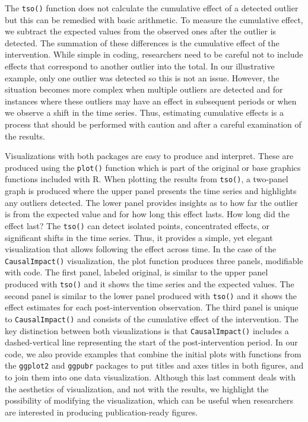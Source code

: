 \documentclass[12pt]{article}
\begin{document}
The \texttt{tso()} function does not calculate the cumulative effect of
a detected outlier but this can be remedied with basic arithmetic. To
measure the cumulative effect, we subtract the expected values from the
observed ones after the outlier is detected. The summation of these
differences is the cumulative effect of the intervention. While simple
in coding, researchers need to be careful not to include effects that
correspond to another outlier into the total. In our illustrative
example, only one outlier was detected so this is not an issue. However,
the situation becomes more complex when multiple outliers are detected
and for instances where these outliers may have an effect in subsequent
periods or when we observe a shift in the time series. Thus, estimating
cumulative effects is a process that should be performed with caution
and after a careful examination of the results.

Visualizations with both packages are easy to produce and interpret.
These are produced using the \texttt{plot()} function which is part of
the original or base graphics functions included with R. When plotting
the results from \texttt{tso()}, a two-panel graph is produced where the
upper panel presents the time series and highlights any outliers
detected. The lower panel provides insights as to how far the outlier is
from the expected value and for how long this effect lasts. How long did
the effect last? The \texttt{tso()} can detect isolated points,
concentrated effects, or significant shifts in the time series. Thus, it
provides a simple, yet elegant visualization that allows following the
effect across time. In the case of the \texttt{CausalImpact()}
visualization, the plot function produces three panels, modifiable with
code. The first panel, labeled original, is similar to the upper panel
produced with \texttt{tso()} and it shows the time series and the
expected values. The second panel is similar to the lower panel produced
with \texttt{tso()} and it shows the effect estimates for each
post-intervention observation. The third panel is unique to
\texttt{CausalImpact()} and consists of the cumulative effect of the
intervention. The key distinction between both visualizations is that
\texttt{CausalImpact()} includes a dashed-vertical line representing the
start of the post-intervention period. In our code, we also provide
examples that combine the initial plots with functions from the
\texttt{ggplot2} and \texttt{ggpubr} packages to put titles and axes
titles in both figures, and to join them into one data visualization.
Although this last comment deals with the aesthetics of visualization,
and not with the results, we highlight the possibility of modifying the
visualization, which can be useful when researchers are interested in
producing publication-ready figures.
\end{document}

